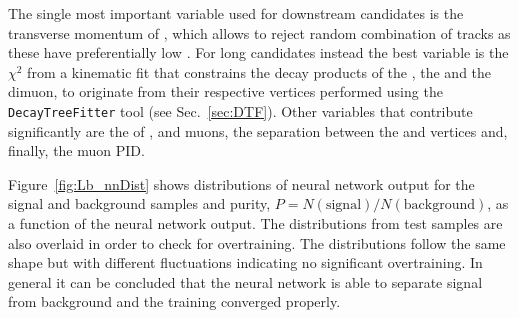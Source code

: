 The single most important variable used for downstream candidates is the transverse momentum of
\Lz, which allows to reject random combination of tracks as these have preferentially low \pt.
For long candidates instead the best variable is the $\chi^2$ from a kinematic fit that constrains
the decay products of the \Lb, the \Lz and the dimuon, to originate from their respective vertices
performed using the \verb!DecayTreeFitter! tool (see Sec.~\ref{sec:DTF}).
Other variables that contribute significantly are the \chisqip of \Lb, \Lz and muons,
the separation between the \Lb and \Lz vertices and, finally, the muon PID.

Figure~\ref{fig:Lb_nnDist} shows distributions of neural network output for the signal and background samples
and purity, $P=N(\mathrm{signal})/N(\mathrm{background})$, as a function of the neural network output.
The distributions from test samples are also overlaid in order to check for overtraining. 
The distributions follow the same shape but with different fluctuations
indicating no significant overtraining. In general it can be concluded that the neural network
is able to separate signal from background and the training converged properly.
%
